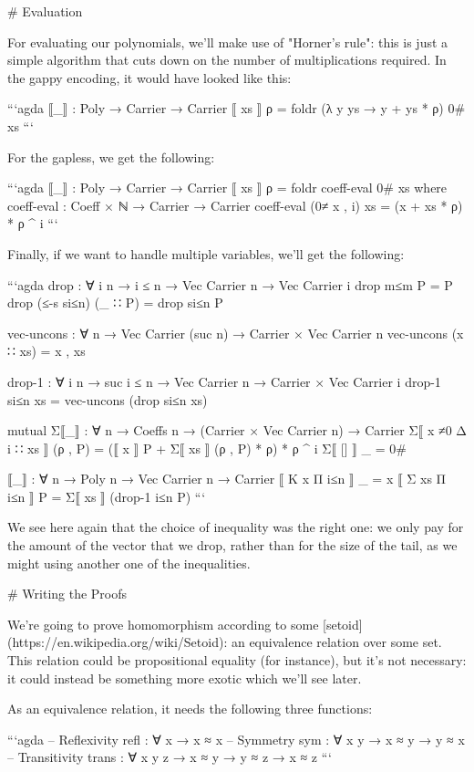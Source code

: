 \documentclass{article}
\begin{document}
# Evaluation

For evaluating our polynomials, we'll make use of "Horner's rule": this is just
a simple algorithm that cuts down on the number of multiplications required. In
the gappy encoding, it would have looked like this:

```agda
⟦_⟧ : Poly → Carrier → Carrier
⟦ xs ⟧ ρ = foldr (λ y ys → y + ys * ρ) 0# xs
```

For the gapless, we get the following:

```agda
⟦_⟧ : Poly → Carrier → Carrier
⟦ xs ⟧ ρ = foldr coeff-eval 0# xs
  where
  coeff-eval : Coeff × ℕ → Carrier → Carrier
  coeff-eval (0≠ x , i) xs = (x + xs * ρ) * ρ ^ i
```

Finally, if we want to handle multiple variables, we'll get the following:

```agda
drop : ∀ {i n} → i ≤ n → Vec Carrier n → Vec Carrier i
drop m≤m Ρ = Ρ
drop (≤-s si≤n) (_ ∷ Ρ) = drop si≤n Ρ

vec-uncons : ∀ {n} → Vec Carrier (suc n) → Carrier × Vec Carrier n
vec-uncons (x ∷ xs) = x , xs

drop-1 : ∀ {i n} → suc i ≤ n → Vec Carrier n → Carrier × Vec Carrier i
drop-1 si≤n xs = vec-uncons (drop si≤n xs)

mutual
  Σ⟦_⟧ : ∀ {n} → Coeffs n → (Carrier × Vec Carrier n) → Carrier
  Σ⟦ x ≠0 Δ i ∷ xs ⟧ (ρ , Ρ) = (⟦ x ⟧ Ρ + Σ⟦ xs ⟧ (ρ , Ρ) * ρ) * ρ ^ i
  Σ⟦ [] ⟧ _ = 0#

  ⟦_⟧ : ∀ {n} → Poly n → Vec Carrier n → Carrier
  ⟦ Κ x  Π i≤n ⟧ _ = x
  ⟦ Σ xs Π i≤n ⟧ Ρ = Σ⟦ xs ⟧ (drop-1 i≤n Ρ)
```

We see here again that the choice of inequality was the right one: we only pay
for the amount of the vector that we drop, rather than for the size of the tail,
as we might using another one of the inequalities.

# Writing the Proofs

We're going to prove homomorphism according to some
[setoid](https://en.wikipedia.org/wiki/Setoid): an equivalence relation over
some set. This relation could be propositional equality (for instance), but it's
not necessary: it could instead be something more exotic which we'll see later.

As an equivalence relation, it needs the following three functions:

```agda
-- Reflexivity
refl : ∀ {x} → x ≈ x
-- Symmetry
sym : ∀ {x y} → x ≈ y → y ≈ x
-- Transitivity
trans : ∀ {x y z} → x ≈ y → y ≈ z → x ≈ z
```
\end{document}
